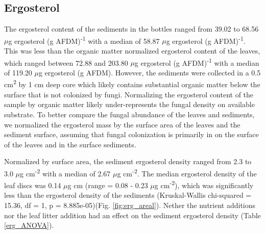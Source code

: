\subsection{Ergosterol}

The ergosterol content of the sediments in the bottles ranged from 39.02 to 68.56 $\mu$g ergosterol (g AFDM)\textsuperscript{-1} with a median of 58.87 $\mu$g ergosterol (g AFDM)\textsuperscript{-1}. This was less than the organic matter normalized ergosterol content of the leaves, which ranged between 72.88 and 203.80 $\mu$g ergosterol (g AFDM)\textsuperscript{-1} with a median of 119.20 $\mu$g ergosterol (g AFDM). However, the sediments were collected in a 0.5 cm\textsuperscript{2} by 1 cm deep core which likely contains substantial organic matter below the surface that is not colonized by fungi. Normalizing the ergosterol content of the sample by organic matter likely under-represents the fungal density on available substrate.  To better compare the fungal abundance of the leaves and sediments, we normalized the ergosterol mass by the surface area of the leaves and the sediment surface, assuming that fungal colonization is primarily in on the surface of the leaves and in the surface sediments.

Normalized by surface area, the sediment ergosterol density ranged from 2.3 to 3.0 $\mu$g cm\textsuperscript{-2} with a median of 2.67 $\mu$g cm\textsuperscript{-2}. The median ergosterol density of the leaf discs was 0.14 $\mu$g cm (range = 0.08 - 0.23 $\mu$g cm\textsuperscript{-2}), which was significantly less than the ergosterol density of the sediments (Kruskal-Wallis chi-squared = 15.36, df = 1, p = 8.885e-05)(Fig. \ref{fig:erg_areal}). Nether the nutrient additions nor the leaf litter addition had an effect on the sediment ergosterol density (Table \ref{erg_ANOVA}).
